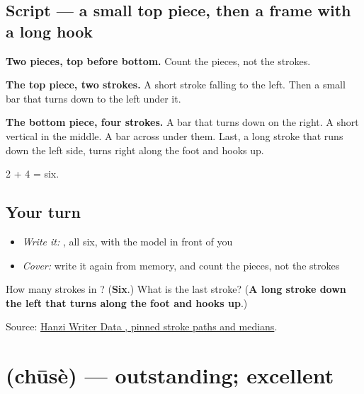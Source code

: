 \subsection*{Script — a small top piece, then a frame with a long hook}

\begin{quote}
\end{quote}

\textbf{Two pieces, top before bottom.} Count the pieces, not the strokes.

\textbf{The top piece, two strokes.} A short stroke falling to the left. Then a small bar that turns down to the left under it.

\textbf{The bottom piece, four strokes.} A bar that turns down on the right. A short vertical in the middle. A bar across under them. Last, a long stroke that runs down the left side, turns right along the foot and hooks up.

2 + 4 = six.

\subsection*{Your turn}
\begin{itemize}
\raggedright
  \item \emph{Write it:} , all six, with the model in front of you
  \item \emph{Cover:} write it again from memory, and count the pieces, not the strokes
\end{itemize}

\begin{tcolorbox}[breakable,colback=teal!4,colframe=teal!35!black,title={Before you move on}]
How many strokes in ? (\textbf{Six}.) What is the last stroke? (\textbf{A long stroke down the left that turns along the foot and hooks up}.)

Source: \href{https://raw.githubusercontent.com/chanind/hanzi-writer-data/68d10a4b21150cae5e1ebbd223eed289cf32d90c/data/\%E8\%89\%B2.json}{Hanzi Writer Data , pinned stroke paths and medians}.
\end{tcolorbox}
\section[\texorpdfstring{\zh{出色} (chūsè)}{出色 (chūsè)}]{ (chūsè) — outstanding; excellent}

